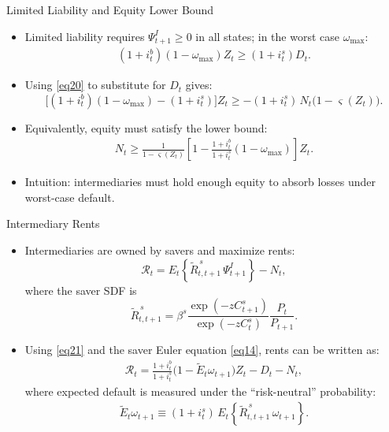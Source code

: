 \documentclass[11pt,aspectratio=169]{beamer}
\begin{document}
\begin{frame}{Limited Liability and Equity Lower Bound}
\small
\begin{itemize}
  \item Limited liability requires $\Psi_{t+1}^I\ge 0$ in all states; in the worst case $\omega_{\max}$:
  \begin{align}
    (1+i_t^b)(1-\omega_{\max})Z_t \ge (1+i_t^s)D_t.
    \label{eq22}
  \end{align}
  \vspace{0.25em}
  \item Using \eqref{eq20} to substitute for $D_t$ gives:
  \[
    \Big[(1+i_t^b)(1-\omega_{\max})-(1+i_t^s)\Big]Z_t
    \ge -(1+i_t^s)\,N_t\big(1-\varsigma(Z_t)\big).
  \]
  \vspace{0.25em}
  \item Equivalently, equity must satisfy the lower bound:
  \begin{align}
    N_t \ge \frac{1}{1-\varsigma(Z_t)}
    \left[1-\frac{1+i_t^b}{1+i_t^s}(1-\omega_{\max})\right]Z_t.
    \label{eq23}
  \end{align}
  \item Intuition: intermediaries must hold enough equity to absorb losses under worst-case default.
\end{itemize}
\end{frame}

\begin{frame}{Intermediary Rents}
\small
\begin{itemize}
  \item Intermediaries are owned by savers and maximize rents:
  \[
    \mathcal{R}_t
    =E_t\!\left\{\tilde{R}^{\,s}_{t,t+1}\,\Psi^I_{t+1}\right\}-N_t,
  \]
  where the saver SDF is
  \[
    \tilde{R}^{\,s}_{t,t+1}
    =\beta^s\frac{\exp(-zC_{t+1}^s)}{\exp(-zC_t^s)}\frac{P_t}{P_{t+1}}.
  \]
  \vspace{0.25em}
  \item Using \eqref{eq21} and the saver Euler equation \eqref{eq14}, rents can be written as:
  \begin{align}
    \mathcal{R}_t
    =\frac{1+i_t^b}{1+i_t^s}\Big(1-\tilde{E}_t\omega_{t+1}\Big)Z_t
    -D_t-N_t,
    \label{eq24}
  \end{align}
  where expected default is measured under the ``risk-neutral'' probability:
  \begin{align}
    \tilde{E}_t\omega_{t+1}
    \equiv (1+i_t^s)\,E_t\!\left\{\tilde{R}^{\,s}_{t,t+1}\,\omega_{t+1}\right\}.
    \label{eq25}
  \end{align}
\end{itemize}
\end{frame}
\end{document}
